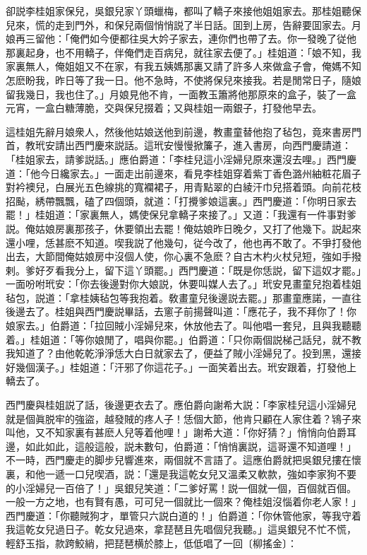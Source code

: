 卻説李桂姐家保兒，吳銀兒家丫頭蠟梅，都叫了轎子來接他姐姐家去。那桂姐聽保兒來，慌的走到門外，和保兒兩個悄悄説了半日話。囬到上房，告辭要囬家去。月娘再三留他：「俺們如今便都往吳大妗子家去，連你們也帶了去。你一發晚了従他那裏起身，也不用轎子，伴俺們走百病兒，就往家去便了。」桂姐道：「娘不知，我家裏無人，俺姐姐又不在家，有我五姨媽那裏又請了許多人來做盒子會，俺媽不知怎麽盼我，昨日等了我一日。他不急時，不使將保兒來接我。若是閒常日子，隨娘留我幾日，我也住了。」月娘見他不肯，一面教玉簫將他那原來的盒子，裝了一盒元宵，一盒白糖薄脆，交與保兒掇着；又與桂姐一兩銀子，打發他早去。

這桂姐先辭月娘衆人，然後他姑娘送他到前邊，教畫童替他抱了毡包，竟來書房門首，教玳安請出西門慶來説話。這玳安慢慢掀簾子，進入書房，向西門慶請道：「桂姐家去，請爹説話。」應伯爵道：「李桂兒這小淫婦兒原來還沒去哩。」西門慶道：「他今日纔家去。」一面走出前邊來，看見李桂姐穿着紫丁香色潞州紬粧花眉子對衿襖兒，白展光五色線挑的寬襴裙子，用青點翠的白綾汗巾兒搭着頭。向前花枝招颭，綉帶飄飄，磕了四個頭，就道：「打攪爹娘這裏。」西門慶道：「你明日家去罷！」桂姐道：「家裏無人，媽使保兒拿轎子來接了。」又道：「我還有一件事對爹説。俺姑娘房裏那孩子，休要領出去罷！俺姑娘昨日晚夕，又打了他幾下。説起來還小哩，恁甚麽不知道。喫我説了他幾句，従今改了，他也再不敢了。不爭打發他出去，大節間俺姑娘房中沒個人使，你心裏不急麽？自古木杓火杖兒短，強如手撥剌。爹好歹看我分上，留下這丫頭罷。」西門慶道：「既是你恁説，留下這奴才罷。」一面吩咐玳安：「你去後邊對你大娘説，休要叫媒人去了。」玳安見畫童兒抱着桂姐毡包，説道：「拿桂姨毡包等我抱着。敎畫童兒後邊説去罷。」那畫童應諾，一直往後邊去了。桂姐與西門慶説畢話，去窻子前揚聲叫道：「應花子，我不拜你了！你娘家去。」伯爵道：「拉回賊小淫婦兒來，休放他去了。叫他唱一套兒，且與我聽聽着。」桂姐道：「等你娘閒了，唱與你罷。」伯爵道：「只你兩個説梯己話兒，就不教我知道了？由他乾乾淨淨恁大白日就家去了，便益了賊小淫婦兒了。投到黑，還接好幾個漢子。」桂姐道：「汗邪了你這花子。」一面笑着出去。玳安跟着，打發他上轎去了。

西門慶與桂姐説了話，後邊更衣去了。應伯爵向謝希大説：「李家桂兒這小淫婦兒就是個眞脱牢的強盜，越發賊的疼人子！恁個大節，他肯只顧在人家住着？鴇子來叫他，又不知家裏有甚麽人兒等着他哩！」謝希大道：「你好猜？」悄悄向伯爵耳邊，如此如此，這般這般，説未數句，伯爵道：「悄悄裏説，這哥還不知道哩！」不一時，西門慶走的脚步兒響進來，兩個就不言語了。這應伯爵就把吳銀兒摟在懷裏，和他一遞一口兒喫酒，説：「還是我這乾女兒又溫柔又軟款，強如李家狗不要的小淫婦兒一百倍了！」吳銀兒笑道：「二爹好罵！説一個就一個，百個就百個。一般一方之地，也有賢有愚，可可兒一個就比一個來？俺桂姐沒惱着你老人家！」西門慶道：「你聽賊狗才，單管只六説白道的！」伯爵道：「你休管他家，等我守着我這乾女兒過日子。乾女兒過來，拿琵琶且先唱個兒我聽。」這吳銀兒不忙不慌，輕舒玉指，款跨鮫綃，把琵琶横於膝上，低低唱了一回〔柳搖金〕：

